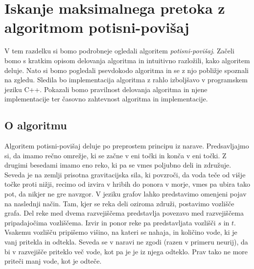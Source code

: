 \documentclass[mat1]{fmfdelo}
\begin{document}
\section{Iskanje maksimalnega pretoka z algoritmom potisni-povišaj}

V tem razdelku si bomo podrobneje ogledali algoritem \textit{potisni-povišaj}. Začeli bomo s kratkim opisom delovanja algoritma in intuitivno razložili, kako algoritem deluje. Nato si bomo pogledali psevdokodo algoritma in se z njo pobližje spoznali na zgledu. Sledila bo implementacija algoritma z rahlo izboljšavo v programskem jeziku C++. Pokazali bomo pravilnost delovanja algoritma in njene implementacije ter časovno zahtevnost algoritma in implementacije.

\subsection{O algoritmu}
Algoritem potisni-povišaj deluje po preprostem principu iz narave. Predsavljajmo si, da imamo rečno omrežje, ki se začne v eni točki in konča v eni točki. Z drugimi besedami imamo eno reko, ki pa se vmes poljubno deli in združuje. Seveda je na zemlji prisotna gravitacijska sila, ki povzroči, da voda teče od višje točke proti nižji, recimo od izvira v hribih do ponora v morje, vmes pa ubira tako pot, da nikjer ne gre navzgor. V jeziku grafov lahko predstavimo omenjeni pojav na naslednji način. Tam, kjer se reka deli oziroma združi, postavimo vozlišče grafa. Del reke med dvema razvejiščema predstavlja povezavo med razvejiščema pripadajočima vozliščema. Izvir in ponor reke pa predstavljata vozlišči $s$ in $t$. Vsakemu vozlišču pripišemo višino, na kateri se nahaja, in količino vode, ki je vanj pritekla in odtekla. Seveda se v naravi ne zgodi (razen v primeru neurij), da bi v razvejišče priteklo več vode, kot pa je je iz njega odteklo. Prav tako ne more priteči manj vode, kot je odteče.
\end{document}
